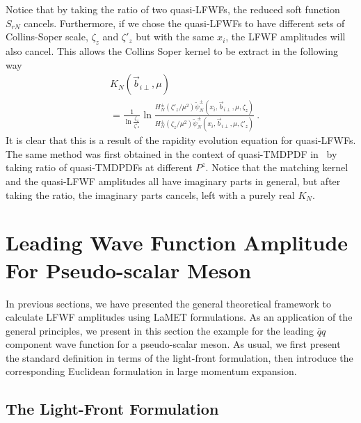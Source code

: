\documentclass[twocolumn,superscriptaddress,longbibliography,10pt]{revtex4-1}
\begin{document}
Notice that by taking the ratio of two quasi-LFWFs, the reduced soft function $S_{rN}$ cancels. Furthermore, if we chose the quasi-LFWFs to have different sets of Collins-Soper scale, $\zeta_{z}$ and $\zeta'_{z}$ but with the same $x_i$, the LFWF amplitudes will also cancel.  This allows the Collins Soper kernel to be extract in the following way
\begin{align}
    &K_{N}(\vec{b}_{i\perp},\mu)\nonumber \\
    &=\frac{1}{\ln \frac{\zeta_{z}}{\zeta'_{z}}} \ln \frac{H_N^{\pm}\left(\zeta'_{z}/\mu^2\right)\widetilde \psi_N^{\pm}(x_i,\vec{b}_{i\perp},\mu,\zeta_{z})}{H_N^{\pm}\left(\zeta_{z}/\mu^2\right)\widetilde \psi_N^{\pm}(x_i,\vec{b}_{i\perp},\mu,\zeta'_{z})} \ .
\end{align}
It is clear that this is a result of the rapidity evolution equation for quasi-LFWFs. The same method was first obtained in the context of quasi-TMDPDF in~\cite{Ebert:2018gzl} by taking ratio of quasi-TMDPDFs at different $P^z$. Notice that the matching kernel and the quasi-LFWF amplitudes all have imaginary parts in general, but after taking the ratio, the imaginary parts cancels, left with a purely real $K_{N}$.


\section{Leading Wave Function Amplitude For Pseudo-scalar Meson }

In previous sections, we have presented the general theoretical framework to calculate LFWF amplitudes using LaMET formulations. As an application of the general principles, we present in this section
the example for the leading $\bar q q$ component wave function for a pseudo-scalar meson. As usual, we first present the standard definition in terms of the light-front formulation, then introduce the corresponding Euclidean formulation in large momentum expansion.

\subsection{The Light-Front Formulation}
\end{document}
